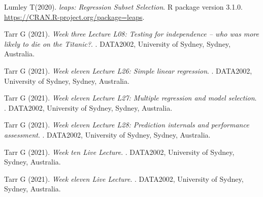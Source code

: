 \documentclass[letterpaper,8pt,twocolumn,twoside,]{pinp}
\begin{document}
\begin{thebibliography}{3}
\bibitem[{Lumley T(2020)}]{}
Lumley T(2020).
\newblock \emph{leaps: Regression Subset Selection}.
\newblock  R package version 3.1.0. \urlprefix\url{https://CRAN.R-project.org/package=leaps}.

\bibitem[{Tarr G (2021)}]{}
Tarr G (2021).
\newblock \emph{Week three Lecture L08: Testing for independence – who was more likely to die on the Titanic?}.
. DATA2002, University of Sydney, Sydney, Australia. 

\bibitem[{Tarr G (2021)}]{}
Tarr G (2021).
\newblock \emph{Week eleven Lecture L26: Simple linear regression}.
. DATA2002, University of Sydney, Sydney, Australia. 

\bibitem[{Tarr G (2021)}]{}
Tarr G (2021).
\newblock \emph{Week eleven Lecture L27: Multiple regression and model selection}.
. DATA2002, University of Sydney, Sydney, Australia. 

\bibitem[{Tarr G (2021)}]{}
Tarr G (2021).
\newblock \emph{Week eleven Lecture L28: Prediction internals and performance assessment}.
. DATA2002, University of Sydney, Sydney, Australia. 

\bibitem[{Tarr G (2021)}]{}
Tarr G (2021).
\newblock \emph{Week ten Live Lecture}.
. DATA2002, University of Sydney, Sydney, Australia. 

\bibitem[{Tarr G (2021)}]{}
Tarr G (2021).
\newblock \emph{Week eleven Live Lecture}.
. DATA2002, University of Sydney, Sydney, Australia. 

\end{thebibliography}
\end{document}
